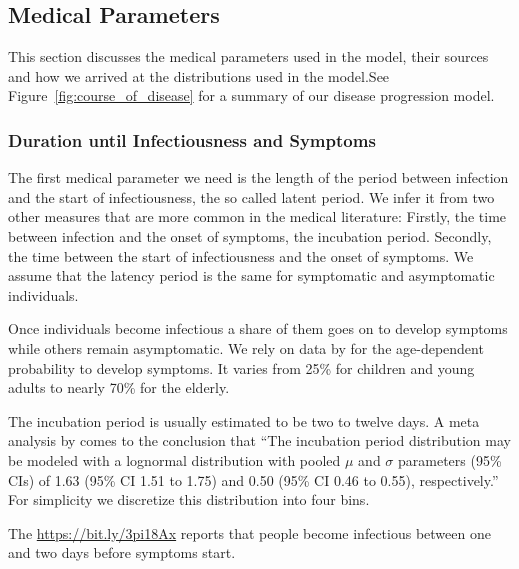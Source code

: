 \subsection{Medical Parameters}

This section discusses the medical parameters used in the model, their sources and how we
arrived at the distributions used in the model.\footnotemark See
Figure~\ref{fig:course_of_disease} for a summary of our disease progression model.


\subsubsection{Duration until Infectiousness and Symptoms}

The first medical parameter we need is the length of the period between infection and
the start of infectiousness, the so called latent period.
We infer it from two other measures that are more common in the medical literature:
Firstly, the time between infection and the onset of symptoms, the incubation period.
Secondly, the time between the start of infectiousness and the onset of symptoms.
We assume that the latency period is the same for symptomatic and asymptomatic individuals.

Once individuals become infectious a share of them goes on to develop symptoms while
others remain asymptomatic.
We rely on data by \cite{Davies2020} for the age-dependent probability to develop
symptoms. It varies from 25\% for children and young adults to nearly 70\% for the
elderly.

The incubation period is usually estimated to be two to twelve days.
A meta analysis by \citet{McAloon2020} comes to the conclusion that
``The incubation period distribution may be modeled with a lognormal distribution with
pooled $\mu$ and $\sigma$ parameters (95\% CIs) of 1.63 (95\% CI 1.51 to 1.75) and 0.50
(95\% CI 0.46 to 0.55), respectively.''
For simplicity we discretize this distribution into four bins.

The \href{European Centre for Disease Prevention and Control}{https://bit.ly/3pi18Ax}
reports that people become infectious between one and two days before symptoms start.\footnotemark


